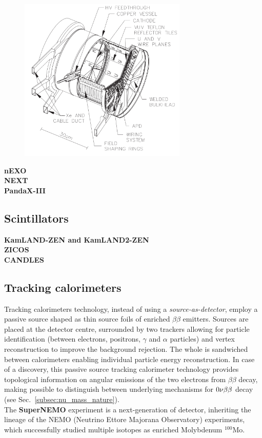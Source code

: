 \begin{figure}
  \centering
  \includegraphics[width=8cm]{0nubbexperiments/fig_0nubbexperiments/EXO-200.png}
  \caption{\label{fig:EXO-200}}

\end{figure}

\textbf{nEXO}\\
\textbf{NEXT}\\
\textbf{PandaX-III}
\subsection{Scintillators}
\label{subsec:scintillators}
\textbf{KamLAND-ZEN and KamLAND2-ZEN}\\
\textbf{ZICOS}\\
\textbf{CANDLES}
\subsection{Tracking calorimeters}
\label{subsec:trackocalo}
Tracking calorimeters technology, instead of using a \emph{source-as-detector}, employ a passive source shaped as thin source foils of enriched $\beta\beta$ emitters.
Sources are placed at the detector centre, surrounded by two trackers allowing for particle identification (between electrons, positrons, $\gamma$ and $\alpha$ particles) and vertex reconstruction to improve the background rejection.
The whole is sandwiched between calorimeters enabling individual particle energy reconstruction.
In case of a discovery, this passive source tracking calorimeter technology provides topological information on angular emissions of the two electrons from $\beta\beta$ decay, making possible to distinguish between underlying mechanisms for $0\nu\beta\beta$ decay (see Sec.~\ref{subsec:nu_mass_nature}).\\

The \textbf{SuperNEMO} experiment is a next-generation of detector, inheriting the lineage of the NEMO (Neutrino Ettore Majorana Observatory) experiments, which successfully studied multiple isotopes as enriched Molybdenum $^{100}$Mo.
